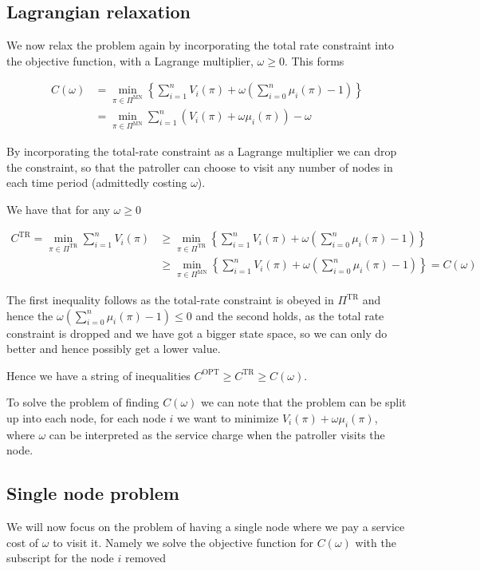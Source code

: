 \documentclass[a4paper,10pt]{article}
\theoremstyle{definition}
\theoremstyle{definition}
\theoremstyle{remark}
\theoremstyle{definition}
\begin{document}
\subsection{Lagrangian relaxation}
We now relax the problem again by incorporating the total rate constraint into the objective function, with a Lagrange multiplier, $\omega \geq 0$. This forms

\begin{align*}
C(\omega)&=\min_{\pi \in \Pi^{\text{MN}}} \left\{ \sum\limits_{i=1}^{n} V_{i}(\pi) + \omega \left( \sum\limits_{i=0}^{n} \mu_{i}(\pi) -1 \right) \right\} \\
&=\min_{\pi \in \Pi^{\text{MN}}} \sum\limits_{i=1}^{n} (V_{i}(\pi)+\omega \mu_{i}(\pi)) - \omega
\end{align*}

By incorporating the total-rate constraint as a Lagrange multiplier we can drop the constraint, so that the patroller can choose to visit any number of nodes in each time period (admittedly costing $\omega$).

We have that for any $\omega \geq 0$

\begin{align*}
C^{\text{TR}}=\min_{\pi \in \Pi^{\text{TR}}} \sum\limits_{i=1}^{n} V_{i}(\pi) &\geq \min_{\pi \in \Pi^{\text{TR}}} \left\{ \sum\limits_{i=1}^{n} V_{i}(\pi) + \omega \left( \sum\limits_{i=0}^{n} \mu_{i}(\pi) -1 \right) \right\} \\
&\geq \min_{\pi \in \Pi^{\text{MN}}} \left\{ \sum\limits_{i=1}^{n} V_{i}(\pi) + \omega \left( \sum\limits_{i=0}^{n} \mu_{i}(\pi) -1 \right) \right\}=C(\omega)
\end{align*}

The first inequality follows as the total-rate constraint is obeyed in $\Pi^{\text{TR}}$ and hence the $\omega \left( \sum\limits_{i=0}^{n} \mu_{i}(\pi) -1 \right) \leq 0$ and the second holds, as the total rate constraint is dropped and we have got a bigger state space, so we can only do better and hence possibly get a lower value.

Hence we have a string of inequalities $C^{\text{OPT}} \geq C^{\text{TR}} \geq C(\omega)$.

To solve the problem of finding $C(\omega)$ we can note that the problem can be split up into each node, for each node $i$ we want to minimize $V_{i}(\pi)+\omega \mu_{i}(\pi)$, where $\omega$ can be interpreted as the service charge when the patroller visits the node.

\subsection{Single node problem}
We will now focus on the problem of having a single node where we pay a service cost of $\omega$ to visit it. Namely we solve the objective function for $C(\omega)$ with the subscript for the node $i$ removed
\end{document}
